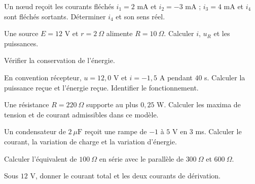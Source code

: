 \begin{questions}
\item Un nœud reçoit les courants fléchés $i_1=2$ mA et $i_2=-3$ mA ; $i_3=4$ mA et $i_4$ sont fléchés sortants. Déterminer $i_4$ et son sens réel.
\end{questions}

\begin{questions}
\item Une source $E=12$ V et $r=2\ \Omega$ alimente $R=10\ \Omega$. Calculer $i$, $u_R$ et les puissances.
\item Vérifier la conservation de l’énergie.
\end{questions}



\begin{questions}
\item En convention récepteur, $u=12{,}0$ V et $i=-1{,}5$ A pendant $40$ s. Calculer la puissance reçue et l’énergie reçue. Identifier le fonctionnement.
\end{questions}

\begin{questions}
\item Une résistance $R=220\ \Omega$ supporte au plus $0{,}25$ W. Calculer les maxima de tension et de courant admissibles dans ce modèle.
\end{questions}

\begin{questions}
\item Un condensateur de $2\ \mu\mathrm{ F}$ reçoit une rampe de $-1$ à $5$ V en $3$ ms. Calculer le courant, la variation de charge et la variation d’énergie.
\end{questions}



\begin{questions}
\item Calculer l’équivalent de $100\ \Omega$ en série avec le parallèle de $300\ \Omega$ et $600\ \Omega$.
\item Sous $12$ V, donner le courant total et les deux courants de dérivation.
\end{questions}


